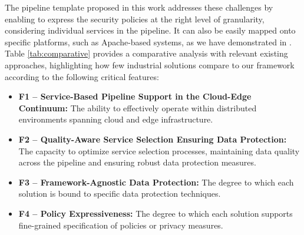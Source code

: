 The pipeline template proposed in this work addresses these challenges by enabling to express the security policies at the right level of granularity, considering individual services in the pipeline. It can also be easily mapped onto specific platforms, such as Apache-based systems, as we have demonstrated in \cite{medes2021}.
Table \ref{tab:comparative} provides a comparative analysis with relevant existing approaches, highlighting how few industrial solutions compare to our framework according to the following critical features:
\begin{itemize}
    \item \textbf{F1 -- Service-Based Pipeline Support in the Cloud-Edge Continuum:} The ability to effectively operate within distributed environments spanning cloud and edge infrastructure.
    \item \textbf{F2 -- Quality-Aware Service Selection Ensuring Data Protection:} The capacity to optimize service selection processes, maintaining data quality across the pipeline and ensuring robust data protection measures.
    \item \textbf{F3 -- Framework-Agnostic Data Protection:} The degree to which each solution is bound to specific data protection techniques.
    \item \textbf{F4 -- Policy Expressiveness:} The degree to which each solution supports fine-grained specification of policies or privacy measures.
\end{itemize}

